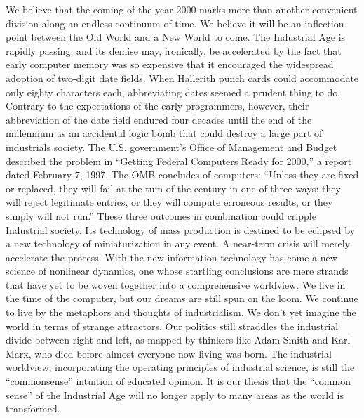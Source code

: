 \begin{Parallel}{97mm}{45mm}
  \ParallelLText
  {We believe that the coming of the year 2000 marks more than another convenient division along an endless continuum of time. We believe it will be an inflection point between the Old World and a New World to come. The Industrial Age is rapidly passing, and its demise may, ironically, be accelerated by the fact that early computer memory was so expensive that it encouraged the widespread adoption of two-digit date fields. When Hallerith punch cards could accommodate only eighty characters each, abbreviating dates seemed a prudent thing to do. Contrary to the expectations of the early programmers, however, their abbreviation of the date field endured four decades until the end of the millennium as an accidental logic bomb that could destroy a large part of industrials society. The U.S. government's Office of Management and Budget described the problem in “Getting Federal Computers Ready for 2000,” a report dated February 7, 1997. The OMB concludes of computers: “Unless they are fixed or replaced, they will fail at the tum of the century in one of three ways: they will reject legitimate entries, or they will compute erroneous results, or they simply will not run.” These three outcomes in combination could cripple Industrial society. Its technology of mass production is destined to be eclipsed by a new technology of miniaturization in any event. A near-term crisis will merely accelerate the process. With the new information technology has come a new science of nonlinear dynamics, one whose startling conclusions are mere strands that have yet to be woven together into a comprehensive worldview. We live in the time of the computer, but our dreams are still spun on the loom. We continue to live by the metaphors and thoughts of industrialism. We don't yet imagine the world in terms of strange attractors. Our politics still straddles the industrial divide between right and left, as mapped by thinkers like Adam Smith and Karl Marx, who died before almost everyone now living was born. The industrial worldview, incorporating the operating principles of industrial science, is still the “commonsense” intuition of educated opinion. It is our thesis that the “common sense” of the Industrial Age will no longer apply to many areas as the world is transformed.}  
  \ParallelRText

\end{Parallel}
